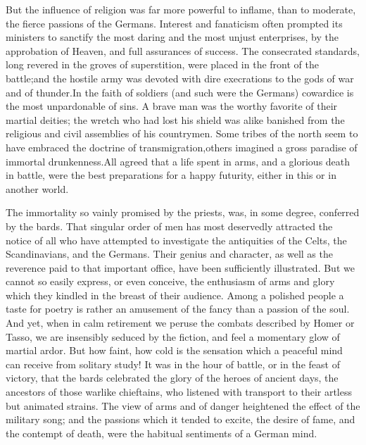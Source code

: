 But the influence of religion was far more powerful to inflame,
than to moderate, the fierce passions of the Germans. Interest
and fanaticism often prompted its ministers to sanctify the most
daring and the most unjust enterprises, by the approbation of
Heaven, and full assurances of success. The consecrated
standards, long revered in the groves of superstition, were
placed in the front of the battle;\footnotemark[67] and the hostile army was
devoted with dire execrations to the gods of war and of thunder.\footnotemark[68]
In the faith of soldiers (and such were the Germans) cowardice
is the most unpardonable of sins. A brave man was the worthy
favorite of their martial deities; the wretch who had lost his
shield was alike banished from the religious and civil assemblies
of his countrymen. Some tribes of the north seem to have embraced
the doctrine of transmigration,\footnotemark[69] others imagined a gross
paradise of immortal drunkenness.\footnotemark[70] All agreed that a life spent
in arms, and a glorious death in battle, were the best
preparations for a happy futurity, either in this or in another
world.





The immortality so vainly promised by the priests, was, in some
degree, conferred by the bards. That singular order of men has
most deservedly attracted the notice of all who have attempted to
investigate the antiquities of the Celts, the Scandinavians, and
the Germans. Their genius and character, as well as the reverence
paid to that important office, have been sufficiently
illustrated. But we cannot so easily express, or even conceive,
the enthusiasm of arms and glory which they kindled in the breast
of their audience. Among a polished people a taste for poetry is
rather an amusement of the fancy than a passion of the soul. And
yet, when in calm retirement we peruse the combats described by
Homer or Tasso, we are insensibly seduced by the fiction, and
feel a momentary glow of martial ardor. But how faint, how cold
is the sensation which a peaceful mind can receive from solitary
study! It was in the hour of battle, or in the feast of victory,
that the bards celebrated the glory of the heroes of ancient
days, the ancestors of those warlike chieftains, who listened
with transport to their artless but animated strains. The view of
arms and of danger heightened the effect of the military song;
and the passions which it tended to excite, the desire of fame,
and the contempt of death, were the habitual sentiments of a
German mind.\footnotemark[71] \footnotemark[711]

